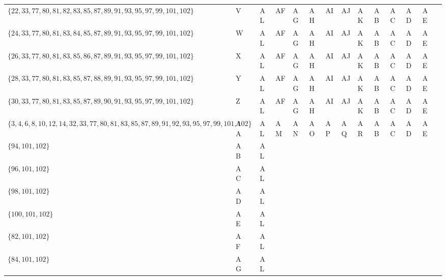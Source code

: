 \documentclass[a3paper]{report}
\begin{document}
\begin{landscape}
\begin{table}[h]
\begin{tabular}{| l | l | l | l | l | l | l | l | l | l | l | l | l | l | l |}
            $\{22,33,77,80,81,82,83,85,87,89,91,93,95,97,99,101,102\}$                       & V         &        & AL & AF & AG & AH & AI & AJ & AK & AB & AC & AD & AE &            \\
            $\{24,33,77,80,81,83,84,85,87,89,91,93,95,97,99,101,102\}$                       & W         &        & AL & AF & AG & AH & AI & AJ & AK & AB & AC & AD & AE &            \\
            $\{26,33,77,80,81,83,85,86,87,89,91,93,95,97,99,101,102\}$                       & X         &        & AL & AF & AG & AH & AI & AJ & AK & AB & AC & AD & AE &            \\
            $\{28,33,77,80,81,83,85,87,88,89,91,93,95,97,99,101,102\}$                       & Y         &        & AL & AF & AG & AH & AI & AJ & AK & AB & AC & AD & AE &            \\
            $\{30,33,77,80,81,83,85,87,89,90,91,93,95,97,99,101,102\}$                       & Z         &        & AL & AF & AG & AH & AI & AJ & AK & AB & AC & AD & AE &            \\
            $\{3,4,6,8,10,12,14,32,33,77,80,81,83,85,87,89,91,92,93,95,97,99,101,102\}$      & AA        &        & AL & AM & AN & AO & AP & AQ & AR & AB & AC & AD & AE &            \\
            $\{94,101,102\}$                                                                 & AB        &        & AL &    &    &    &    &    &    &    &    &    &    &            \\
            $\{96,101,102\}$                                                                 & AC        &        & AL &    &    &    &    &    &    &    &    &    &    &            \\
            $\{98,101,102\}$                                                                 & AD        &        & AL &    &    &    &    &    &    &    &    &    &    &            \\
            $\{100,101,102\}$                                                                & AE        &        & AL &    &    &    &    &    &    &    &    &    &    &            \\
            $\{82,101,102\}$                                                                 & AF        &        & AL &    &    &    &    &    &    &    &    &    &    &            \\
            $\{84,101,102\}$                                                                 & AG        &        & AL &    &    &    &    &    &    &    &    &    &    &            \\

\end{tabular}
\end{table}
\end{landscape}
\end{document}

